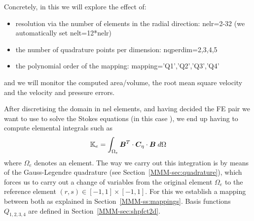 Concretely, in this \stone we will explore the effect of:
\begin{itemize}
\item resolution via the number of elements in the radial direction: {\python nelr=2-32} (we automatically set {\python nelt=12*nelr})
\item the number of quadrature points per dimension: {\python nqperdim=2,3,4,5}
\item the polynomial order of the mapping: {\python mapping='Q1','Q2','Q3','Q4'}
\end{itemize}
and we will monitor the computed area/volume, the root mean square velocity and the velocity and pressure errors.

After discretising the domain in {\python nel} elements, and having decided the FE
pair we want to use to solve the Stokes equations (in this case \QtwoQone), we end up 
having to compute elemental integrals such as 
\[
{\mathbb{K}}_e = \int_{\Omega_e} {\bm B}^T\cdot {\bm C}_\eta \cdot {\bm B} \; d\Omega
\]
where $\Omega_e$ denotes an element.
The way we carry out this integration is by means of the Gauss-Legendre quadrature
(see Section~\ref{MMM-sec:quadrature}), which 
forces us to carry out a change of variables from the original element $\Omega_e$ 
to the reference element $(r,s) \in [-1,1]\times [-1,1]$. For this we establish a mapping between both 
as explained in Section~\ref{MMM-ss:mappings}.
Basis functions $Q_{1,2,3,4}$ are defined in Section~\ref{MMM-sec:shpfct2d}.

